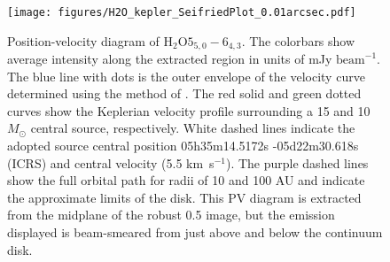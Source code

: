 \documentclass[twocolumn]{aastex61}
\newcommand{\msun}{\ensuremath{M_{\odot}}\xspace}			%
\newcommand{\hh}{\ensuremath{\textrm{H}_{2}}\xspace}			%
\newcommand{\methanol}{\ensuremath{\textrm{CH}_3\textrm{OH}}\xspace}
\newcommand{\water}{H$_{2}$O\xspace}		%
\newcommand{\kms}{\textrm{km~s}\ensuremath{^{-1}}\xspace}	%
\newcommand{\perbeam}{\ensuremath{\textrm{beam}^{-1}}\xspace}
\begin{document}
\begin{figure}[!htp]
\texttt{[image: figures/H2O\_kepler\_SeifriedPlot\_0.01arcsec.pdf]}
\caption{Position-velocity diagram of \water $5_{5,0}-6_{4,3}$.
The colorbars show average intensity along the extracted region in units
of mJy \perbeam.
The blue line with dots is the outer envelope of the velocity curve
determined using the method of \citet{Seifried2016a}.
The red solid and green dotted curves show the Keplerian velocity profile
surrounding a 15 and 10 \msun central source, respectively.
White dashed lines indicate the adopted source central position
05h35m14.5172s -05d22m30.618s (ICRS)
and central velocity (5.5 \kms).
The purple dashed lines show the full orbital path for radii of
10 and 100 AU and indicate the approximate limits of the disk.
This PV diagram is extracted from the midplane of the robust 0.5 image,
but the emission displayed is beam-smeared from just above and below the
continuum disk.
}
\label{fig:h2okepler}
\end{figure}




% 
% 
\end{document}
